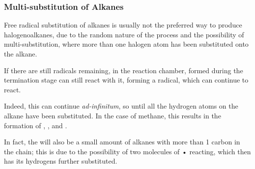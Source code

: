 

	\subsubsection{Multi-substitution of Alkanes}

		Free radical substitution of alkanes is usually not the preferred way to produce halogenoalkanes, due to the random
		nature of the process and the possibility of multi-substitution, where more than one halogen atom has been substituted
		onto the alkane.

		If there are still \ce{\chlorine} radicals remaining, in the reaction chamber,  formed during the
		termination stage can still react with it, forming a  radical, which can continue to react.


		\vspace{-15mm}

		Indeed, this can continue \textit{ad-infinitum}, so until all the hydrogen atoms on the alkane have been substituted.
		In the case of methane, this results in the formation of , ,  and
		.

		In fact, the will also be a small amount of alkanes with more than 1 carbon in the chain; this is due to the
		possibility of two molecules of • reacting, which then has its hydrogens further substituted.































